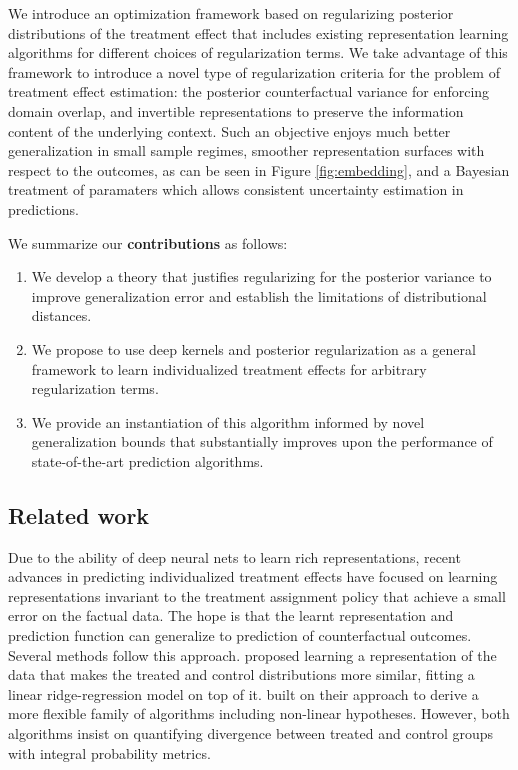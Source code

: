 \documentclass[twoside]{article}
\begin{document}
We introduce an optimization framework based on regularizing posterior distributions of the treatment effect that includes existing representation learning algorithms for different choices of regularization terms. We take advantage of this framework to introduce a novel type of regularization criteria for the problem of treatment effect estimation: the posterior counterfactual variance for enforcing domain overlap, and invertible representations to preserve the information content of the underlying context. Such an objective enjoys much better generalization in small sample regimes, smoother representation surfaces with respect to the outcomes, as can be seen in Figure \ref{fig:embedding}, and a Bayesian treatment of paramaters which allows consistent uncertainty estimation in predictions. 

We summarize our \textbf{contributions} as follows:
\begin{enumerate}[topsep=0pt,itemsep=0pt]
    \item We develop a theory that justifies regularizing for the posterior variance to improve generalization error and establish the limitations of distributional distances.
    \item We propose to use deep kernels and posterior regularization as a general framework to learn individualized treatment effects for arbitrary regularization terms. 
    \item We provide an instantiation of this algorithm informed by novel generalization bounds that substantially improves upon the performance of state-of-the-art prediction algorithms. 
\end{enumerate}



\subsection{Related work} 
Due to the ability of deep neural nets to learn rich representations, recent advances in predicting individualized treatment effects have focused on learning representations invariant to the treatment assignment policy that achieve a small error on the factual data. The hope is that the learnt representation and prediction function can generalize to prediction of counterfactual outcomes. Several methods follow this approach. \cite{johansson2016learning} proposed learning a representation of the data that makes the treated and control distributions more similar, fitting a linear ridge-regression model on top of it. \cite{shalit2017estimating} built on their approach to derive a more flexible family of algorithms including non-linear hypotheses. However, both algorithms insist on quantifying divergence between treated and control groups with integral probability metrics. 
\end{document}
